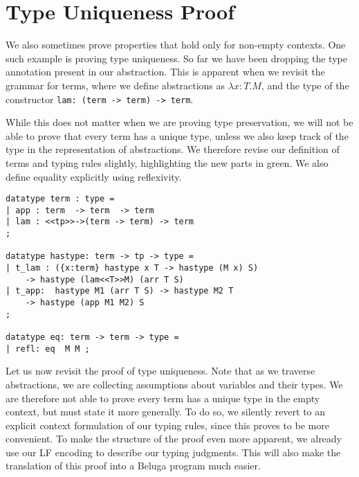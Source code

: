 





\section{Type Uniqueness Proof}
We also sometimes prove properties that hold only for non-empty
contexts. One such example is proving type uniqueness. So far we have
been dropping the type annotation present in our abstraction. This is
apparent when we revisit the grammar for terms, where we define
abstractions as $\lambda x{:}T.M$, and the type of the constructor
\lstinline!lam: (term -> term) -> term!. 

While this does not matter when we are proving type preservation, we
will not be able to prove that every term has a unique type, unless we
also keep track of the type in the representation of abstractions. We
therefore revise our definition of terms and typing rules slightly,
highlighting the new parts in green. We also define equality
explicitly using reflexivity.

\begin{lstlisting}
datatype term : type = 
| app : term  -> term  -> term
| lam : <<tp>>->(term -> term) -> term
;

datatype hastype: term -> tp -> type =
| t_lam : ({x:term} hastype x T -> hastype (M x) S)
	-> hastype (lam<<T>>M) (arr T S)
| t_app:  hastype M1 (arr T S) -> hastype M2 T
	-> hastype (app M1 M2) S
;  

datatype eq: term -> term -> type =
| refl: eq  M M ;
\end{lstlisting}

Let us now revisit the proof of type uniqueness. Note that as we traverse
abstractions, we are collecting assumptions about variables and their
types. We are therefore not able to prove every term has a unique type
in the empty context, but must state it more generally. To do so, we
silently revert to an explicit context formulation of our typing
rules, since this proves to be more convenient. To make the structure
of the proof even more apparent, we already use our LF encoding to
describe our typing judgments. This will also make the translation of
this proof into a Beluga program much easier.

